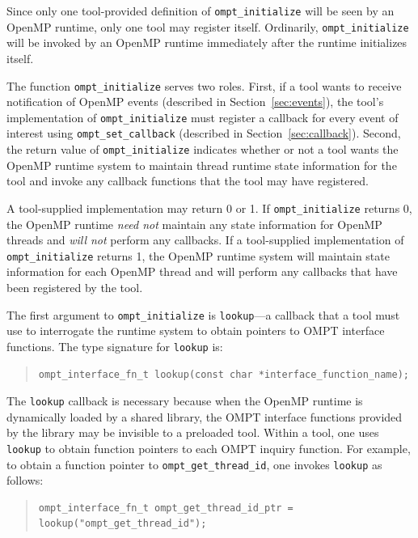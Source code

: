 \documentclass{article}
\begin{document}
\noindent
Since only one tool-provided definition of \verb|ompt_initialize| will be seen by an OpenMP runtime, only one tool
may register itself. Ordinarily, \verb|ompt_initialize| will  be invoked by an OpenMP runtime immediately after the runtime initializes itself. 

The function  \verb|ompt_initialize| serves two roles. First,  if a tool wants to receive notification of OpenMP events (described in Section~\ref{sec:events}), the tool's implementation of \verb|ompt_initialize| must register a callback for every event of interest using \verb|ompt_set_callback| (described in Section~\ref{sec:callback}). 
Second, the return value of  \verb|ompt_initialize|  indicates whether or not a tool wants the OpenMP runtime system to maintain thread runtime state information for the tool and invoke any callback functions that the tool may have registered. 

A tool-supplied implementation may return 0 or 1.  If \verb|ompt_initialize|  returns 0, the OpenMP runtime {\em need not} maintain any state information for OpenMP threads and {\em will not} perform any callbacks.
If a tool-supplied implementation of \verb|ompt_initialize| returns 1, the OpenMP runtime system will maintain state information for each OpenMP thread and will perform any callbacks that have been registered by the tool. 

The first argument to \verb|ompt_initialize| is \verb|lookup|---a callback that a tool must use to interrogate the runtime system to obtain pointers to OMPT interface functions.
The type signature for  \verb|lookup| is:

\begin{quote}
\begin{verbatim}
ompt_interface_fn_t lookup(const char *interface_function_name);
\end{verbatim}
\end{quote}

\noindent
The \verb|lookup| callback is necessary because when the OpenMP runtime is dynamically loaded by a shared library, the OMPT interface functions provided by the library may be invisible to a preloaded tool. Within a tool, one uses \verb|lookup| to obtain function pointers to each OMPT inquiry function. For example, to obtain a function pointer to \verb|ompt_get_thread_id|, one invokes \verb|lookup| as follows:

\begin{quote}
\begin{verbatim}
ompt_interface_fn_t ompt_get_thread_id_ptr = lookup("ompt_get_thread_id");
\end{verbatim}
\end{quote}
\end{document}
